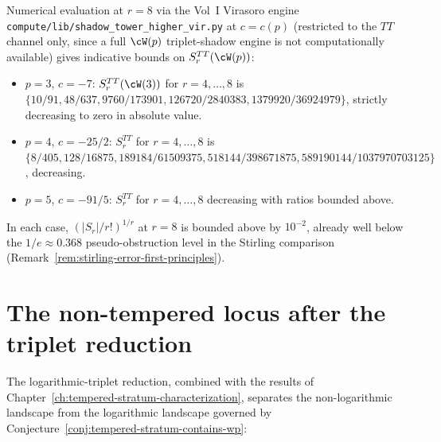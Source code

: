 \begin{remark}
\label{rem:wp-finite-r-evidence}
Numerical evaluation at $r = 8$ via the Vol~I Virasoro engine
\texttt{compute/lib/shadow\_tower\_higher\_vir.py} at $c = c(p)$
(restricted to the $TT$ channel only, since a full $\cW(p)$
triplet-shadow engine is not computationally available) gives
indicative bounds on $S_r^{TT}(\cW(p))$:
\begin{itemize}[nosep]
\item $p = 3$, $c = -7$: $S_r^{TT}(\cW(3))$ for $r = 4, \ldots, 8$ is
 $\{10/91, 48/637, 9760/173901, 126720/2840383, 1379920/36924979\}$,
 strictly decreasing to zero in absolute value.
\item $p = 4$, $c = -25/2$: $S_r^{TT}$ for $r = 4, \ldots, 8$ is
 $\{8/405, 128/16875, 189184/61509375, 518144/398671875,
 589190144/1037970703125\}$, decreasing.
\item $p = 5$, $c = -91/5$: $S_r^{TT}$ for $r = 4, \ldots, 8$
 decreasing with ratios bounded above.
\end{itemize}
In each case, $(\lvert S_r \rvert / r!)^{1/r}$ at $r = 8$ is bounded
above by $10^{-2}$, already well below the $1/e \approx 0.368$
pseudo-obstruction level in the Stirling comparison
(Remark~\ref{rem:stirling-error-first-principles}).
\end{remark}

\section{The non-tempered locus after the triplet reduction}
\label{sec:non-tempered-locus-triplet-reduction}

The logarithmic-triplet reduction, combined with the
results of Chapter~\ref{ch:tempered-stratum-characterization},
separates the non-logarithmic landscape from the logarithmic landscape
governed by Conjecture~\ref{conj:tempered-stratum-contains-wp}:

